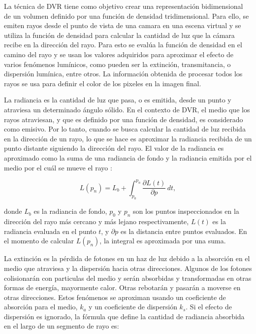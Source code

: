 \documentclass[oneside,a4paper,spanish,links]{amca}
\begin{document}
La técnica de DVR tiene como objetivo crear una representación
bidimensional de un vo\-lu\-men definido por una función de densidad
tridimensional. Para ello, se emiten rayos desde el punto de vista de
una camara en una escena virtual y se utiliza la función de densidad
para calcular la cantidad de luz que la cámara recibe en la dirección
del rayo. Para esto se evalúa la función de densidad en el camino del
rayo y se usan los valores adquiridos para aproximar el efecto de
varios fenómenos lumínicos, como pueden ser la extinción,
transmitancia, o dispersión lumínica, entre otros. La información
obtenida de procesar todos los rayos se usa para definir el color de
los pixeles en la imagen final.

La radiancia es la cantidad de luz que pasa, o es emitida, desde un
punto y atraviesa un determinado ángulo sólido. En el contexto de DVR,
el medio que los rayos atraviesan, y que es definido por una función
de densidad, es considerado como emisivo. Por lo tanto, cuando se
busca calcular la cantidad de luz recibida en la dirección de un rayo,
lo que se hace es aproximar la radiancia recibida de un punto distante
siguiendo la dirección del rayo. El valor de la radiancia es
aproximado como la suma de una radiancia de fondo y la radiancia
emitida por el medio por el cuál se mueve el rayo \citep{Kratz2006} :

\begin{equation} \label{eq:general_radiance}  
  L(p_n) = L_b + \int_{p_0}^{p_n} \frac{\partial L(t)}{\partial p} \, dt,
\end{equation}

\noindent donde $L_b$ es la radiancia de fondo, $p_0$ y $p_n$ son los
puntos inspeccionados en la dirección del rayo más cercano y más
lejano respectivamente, $L(t)$ es la radiancia evaluada en el punto
$t$, y $\partial p$ es la distancia entre puntos evaluados. En el
momento de calcular $L(p_n)$, la integral es aproximada por una suma.

La extinción es la pérdida de fotones en un haz de luz debido a la
absorción en el medio que atraviesa y la dispersión hacia otras
direcciones. Algunos de los fotones colisionarán con particulas del
medio y serán absorbidas y transformadas en otras formas de energía,
mayormente calor. Otras rebotarán y pasarán a moverse en otras
direcciones. Estos fenómenos se aproximan usando un coeficiente de
absorción para el medio, $k_a$ y un coeficiente de dispersión
$k_s$. Si el efecto de dispersión es ignorado, la fórmula que define
la cantidad de radiancia absorbida en el largo de un segmento de rayo
es: 
\end{document}
